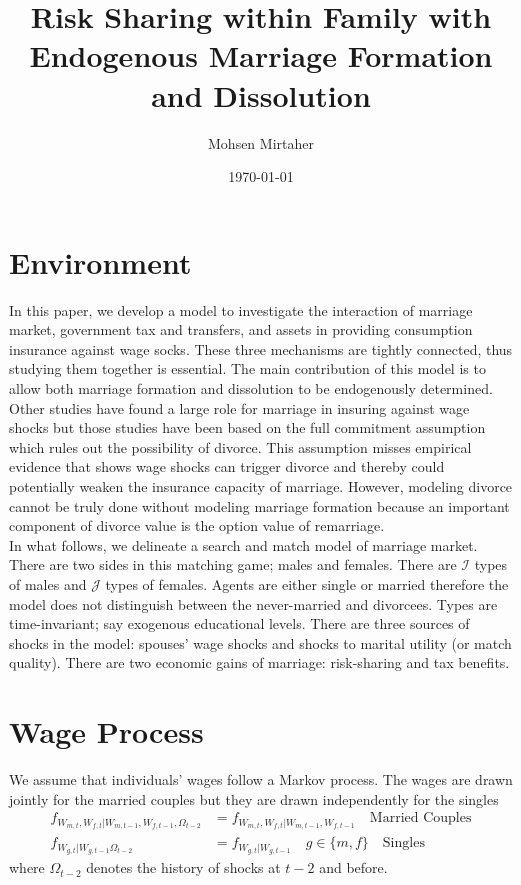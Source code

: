 
\usepackage[titletoc]{appendix}
\doublespacing


\title{Risk Sharing within Family with Endogenous Marriage Formation and Dissolution}
\author{Mohsen Mirtaher}
\date{\today}
\maketitle

 \section{Environment}
In this paper, we develop a model to investigate the interaction of marriage market, government tax and transfers, and assets in providing consumption insurance against wage socks. These three mechanisms are tightly connected, thus studying them together is essential. The main contribution of this model is to allow both marriage formation and dissolution to be endogenously determined. Other studies have found a large role for marriage in insuring against wage shocks but those studies have been based on the full commitment assumption which rules out the possibility of divorce. This assumption misses empirical evidence that shows wage shocks can trigger divorce and thereby could potentially weaken the insurance capacity of marriage. However, modeling divorce cannot be truly done without modeling marriage formation because an important component of divorce value is the option value of remarriage.  \\

In what follows, we delineate a search and match model of marriage market. There are two sides in this matching game; males and females. There are $\mathcal I$ types of males and $\mathcal J$ types of females. Agents are either single or married therefore the model does not distinguish between the never-married and divorcees. Types are time-invariant; say exogenous educational levels. There are three sources of shocks in the model: spouses' wage shocks and shocks to marital utility (or match quality). There are two economic gains of marriage: risk-sharing and tax benefits. 

\section{Wage Process}
We assume that individuals' wages follow a Markov process. The wages are drawn jointly for the married couples but they are drawn independently for the singles
\begin{align*}
f_{W_{m,t}, W_{f,t}|W_{m, t-1}, W_{f, t-1}, \Omega_{t-2}} &= f_{W_{m,t}, W_{f,t}|W_{m, t-1}, W_{f, t-1}}\quad \text{Married Couples} \\
f_{W_{g,t}|W_{g, t-1} \Omega_{t-2}} &= f_{W_{g,t}|W_{g, t-1}}\quad g \in \{m,f\} \quad \text{Singles}
\end{align*}
where $\Omega_{t-2}$ denotes the history of shocks at $t-2$ and before. 

